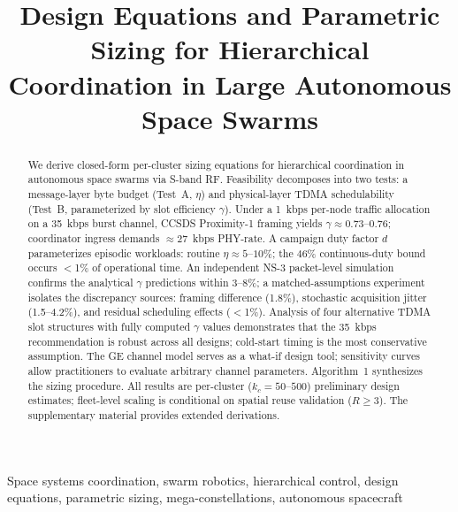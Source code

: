\documentclass[journal]{IEEEtran}
\begin{document}
\title{Design Equations and Parametric Sizing for Hierarchical Coordination in Large Autonomous Space Swarms}

\author{
}


\maketitle

\begin{abstract}
We derive closed-form per-cluster sizing equations for hierarchical coordination in autonomous space swarms via S-band RF. Feasibility decomposes into two tests: a message-layer byte budget (Test~A, $\eta$) and physical-layer TDMA schedulability (Test~B, parameterized by slot efficiency $\gamma$). Under a 1~kbps per-node traffic allocation on a 35~kbps burst channel, CCSDS Proximity-1 framing yields $\gamma \approx 0.73$--$0.76$; coordinator ingress demands ${\approx}27$~kbps PHY-rate. A campaign duty factor $d$ parameterizes episodic workloads: routine $\eta \approx 5$--$10\%$; the $46\%$ continuous-duty bound occurs $<$1\% of operational time. An independent NS-3 packet-level simulation confirms the analytical $\gamma$ predictions within 3--8\%; a matched-assumptions experiment isolates the discrepancy sources: framing difference (1.8\%), stochastic acquisition jitter (1.5--4.2\%), and residual scheduling effects ($<$1\%). Analysis of four alternative TDMA slot structures with fully computed $\gamma$ values demonstrates that the 35~kbps recommendation is robust across all designs; cold-start timing is the most conservative assumption. The GE channel model serves as a what-if design tool; sensitivity curves allow practitioners to evaluate arbitrary channel parameters. Algorithm~1 synthesizes the sizing procedure. All results are per-cluster ($k_c = 50$--$500$) preliminary design estimates; fleet-level scaling is conditional on spatial reuse validation ($R \geq 3$). The supplementary material provides extended derivations.
\end{abstract}

\begin{IEEEkeywords}
Space systems coordination, swarm robotics, hierarchical control, design equations, parametric sizing, mega-constellations, autonomous spacecraft
\end{IEEEkeywords}
\end{document}
